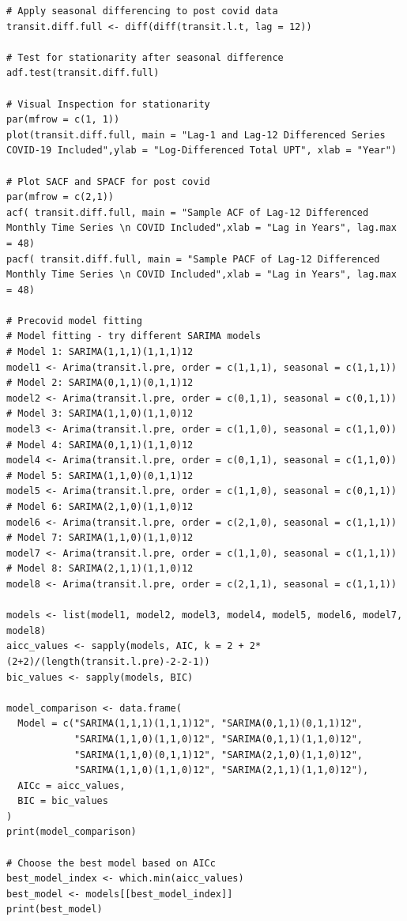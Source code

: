 \documentclass[11pt]{article}
\begin{document}
{\begin{verbatim}
# Apply seasonal differencing to post covid data
transit.diff.full <- diff(diff(transit.l.t, lag = 12))

# Test for stationarity after seasonal difference
adf.test(transit.diff.full)

# Visual Inspection for stationarity
par(mfrow = c(1, 1))
plot(transit.diff.full, main = "Lag-1 and Lag-12 Differenced Series COVID-19 Included",ylab = "Log-Differenced Total UPT", xlab = "Year")

# Plot SACF and SPACF for post covid
par(mfrow = c(2,1))
acf( transit.diff.full, main = "Sample ACF of Lag-12 Differenced Monthly Time Series \n COVID Included",xlab = "Lag in Years", lag.max = 48)
pacf( transit.diff.full, main = "Sample PACF of Lag-12 Differenced Monthly Time Series \n COVID Included",xlab = "Lag in Years", lag.max = 48)

# Precovid model fitting
# Model fitting - try different SARIMA models
# Model 1: SARIMA(1,1,1)(1,1,1)12
model1 <- Arima(transit.l.pre, order = c(1,1,1), seasonal = c(1,1,1))
# Model 2: SARIMA(0,1,1)(0,1,1)12
model2 <- Arima(transit.l.pre, order = c(0,1,1), seasonal = c(0,1,1))
# Model 3: SARIMA(1,1,0)(1,1,0)12
model3 <- Arima(transit.l.pre, order = c(1,1,0), seasonal = c(1,1,0))
# Model 4: SARIMA(0,1,1)(1,1,0)12
model4 <- Arima(transit.l.pre, order = c(0,1,1), seasonal = c(1,1,0))
# Model 5: SARIMA(1,1,0)(0,1,1)12
model5 <- Arima(transit.l.pre, order = c(1,1,0), seasonal = c(0,1,1))
# Model 6: SARIMA(2,1,0)(1,1,0)12
model6 <- Arima(transit.l.pre, order = c(2,1,0), seasonal = c(1,1,1))
# Model 7: SARIMA(1,1,0)(1,1,0)12
model7 <- Arima(transit.l.pre, order = c(1,1,0), seasonal = c(1,1,1))
# Model 8: SARIMA(2,1,1)(1,1,0)12
model8 <- Arima(transit.l.pre, order = c(2,1,1), seasonal = c(1,1,1))

models <- list(model1, model2, model3, model4, model5, model6, model7, model8)
aicc_values <- sapply(models, AIC, k = 2 + 2*(2+2)/(length(transit.l.pre)-2-2-1))
bic_values <- sapply(models, BIC)

model_comparison <- data.frame(
  Model = c("SARIMA(1,1,1)(1,1,1)12", "SARIMA(0,1,1)(0,1,1)12",
            "SARIMA(1,1,0)(1,1,0)12", "SARIMA(0,1,1)(1,1,0)12",
            "SARIMA(1,1,0)(0,1,1)12", "SARIMA(2,1,0)(1,1,0)12",
            "SARIMA(1,1,0)(1,1,0)12", "SARIMA(2,1,1)(1,1,0)12"),
  AICc = aicc_values,
  BIC = bic_values
)
print(model_comparison)

# Choose the best model based on AICc
best_model_index <- which.min(aicc_values)
best_model <- models[[best_model_index]]
print(best_model)


\end{verbatim}}
\end{document}
